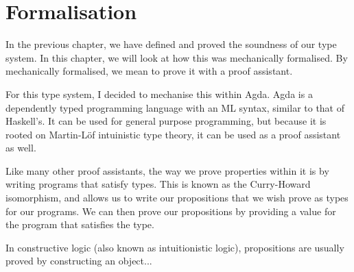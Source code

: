 \chapter{Formalisation}

In the previous chapter, we have defined and proved the soundness of
our type system. In this chapter, we will look at how this was
mechanically formalised. By mechanically formalised, we mean to prove
it with a proof assistant.

For this type system, I decided to mechanise this within Agda. Agda is
a dependently typed programming language with an ML syntax, similar to
that of Haskell's. It can be used for general purpose programming, but
because it is rooted on Martin-Löf intuinistic type theory, it can be
used as a proof assistant as well.

Like many other proof assistants, the way we prove properties within
it is by writing programs that satisfy types. This is known as the
Curry-Howard isomorphism, and allows us to write our propositions that
we wish prove as types for our programs. We can then prove our
propositions by providing a value for the program that satisfies the
type.

In constructive logic (also known as intuitionistic logic),
propositions are usually proved by constructing an object...



